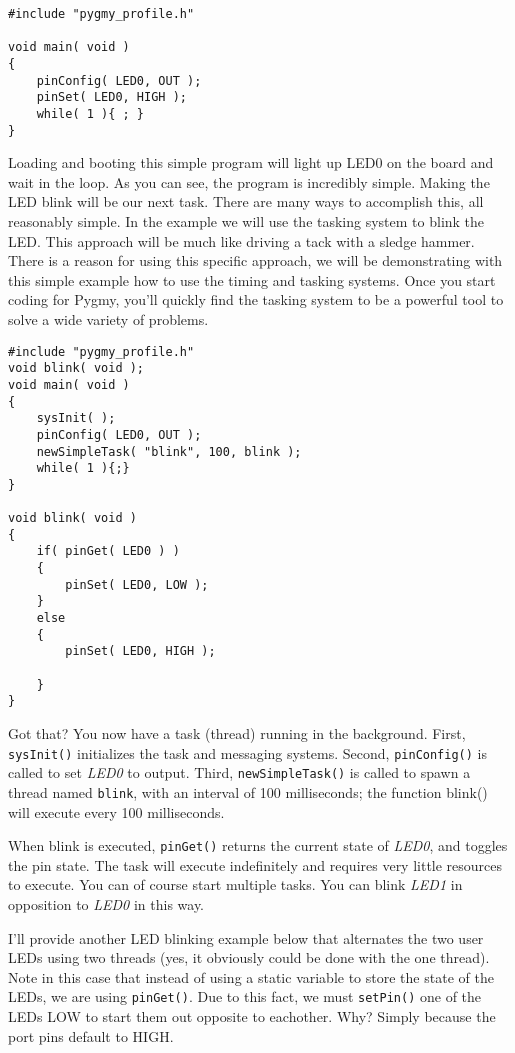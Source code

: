 \documentclass{article}
\begin{document}
\begin{lstlisting}
#include "pygmy_profile.h"

void main( void )
{
	pinConfig( LED0, OUT );
	pinSet( LED0, HIGH );
	while( 1 ){ ; }
}
\end{lstlisting}

Loading and booting this simple program will light up LED0 on the board and wait in the loop. As you can see, the program is incredibly simple. Making the LED blink will be our next task. There are many ways to accomplish this, all reasonably simple. In the example we will use the tasking system to blink the LED. This approach will be much like driving a tack with a sledge hammer. There is a reason for using this specific approach, we will be demonstrating with this simple example how to use the timing and tasking systems. Once you start coding for Pygmy, you'll quickly find the tasking system to be a powerful tool to solve a wide variety of problems.

\begin{lstlisting}
#include "pygmy_profile.h"
void blink( void );
void main( void )
{
	sysInit( );
	pinConfig( LED0, OUT );
	newSimpleTask( "blink", 100, blink );
	while( 1 ){;}
}

void blink( void )
{
	if( pinGet( LED0 ) )
	{
		pinSet( LED0, LOW );
	}
	else
	{
		pinSet( LED0, HIGH );

	}
}
\end{lstlisting}

Got that? You now have a task (thread) running in the background. First, \verb|sysInit()| initializes the task and messaging systems. Second, \verb|pinConfig()| is called to set \emph{LED0} to output. Third, \verb|newSimpleTask()| is called to spawn a thread named \verb|blink|, with an interval of 100 milliseconds; the function blink() will execute every 100 milliseconds.

When blink is executed, \verb|pinGet()| returns the current state of \emph{LED0}, and toggles the pin state. The task will execute indefinitely and requires very little resources to execute. You can of course start multiple tasks. You can blink \emph{LED1} in opposition to \emph{LED0} in this way.

I'll provide another LED blinking example below that alternates the two user LEDs using two threads (yes, it obviously could be done with the one thread). Note in this case that instead of using a static variable to store the state of the LEDs, we are using \verb|pinGet()|. Due to this fact, we must \verb|setPin()| one of the LEDs LOW to start them out opposite to eachother. Why? Simply because the port pins default to HIGH.
\end{document}
